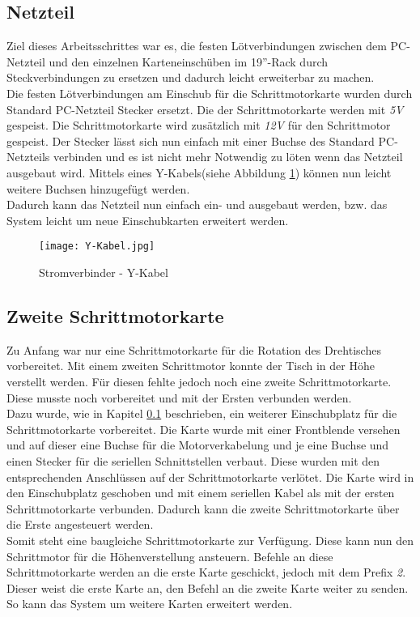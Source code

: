 \subsection{Netzteil}
\label{sec:Netzteil}
Ziel dieses Arbeitsschrittes war es, die festen Lötverbindungen zwischen dem PC-Netzteil und den einzelnen Karteneinschüben im 19''-Rack durch Steckverbindungen zu ersetzen und dadurch leicht erweiterbar zu machen.\\
Die festen Lötverbindungen am Einschub für die Schrittmotorkarte wurden durch Standard PC-Netzteil Stecker ersetzt. %
Die  der Schrittmotorkarte werden mit \emph{5V} gespeist. Die Schrittmotorkarte wird zusätzlich mit \emph{12V} für den Schrittmotor gespeist. Der Stecker lässt sich nun einfach mit einer Buchse des Standard PC-Netzteils verbinden und es ist nicht mehr Notwendig zu löten wenn das Netzteil ausgebaut wird. Mittels eines Y-Kabels(siehe Abbildung \ref{fig:Y-Kabel}) können nun leicht weitere Buchsen hinzugefügt werden.\\
Dadurch kann das Netzteil nun einfach ein- und ausgebaut werden, bzw. das System leicht um neue Einschubkarten erweitert werden.
\begin{figure}[h]
\centering
\texttt{[image: Y-Kabel.jpg]}
\caption{Stromverbinder - Y-Kabel\cite{kosatec}}
\label{fig:Y-Kabel}
\end{figure}

\subsection{Zweite Schrittmotorkarte}
Zu Anfang war nur eine Schrittmotorkarte für die Rotation des Drehtisches vorbereitet. Mit einem zweiten Schrittmotor konnte der Tisch in der Höhe verstellt werden. Für diesen fehlte jedoch noch eine zweite Schrittmotorkarte. Diese musste noch vorbereitet und mit der Ersten verbunden werden.\\
Dazu wurde, wie in Kapitel \ref{sec:Netzteil} beschrieben, ein weiterer Einschubplatz für die Schrittmotorkarte vorbereitet. Die Karte wurde mit einer Frontblende versehen und auf dieser eine Buchse für die Motorverkabelung und je eine Buchse und einen Stecker für die seriellen Schnittstellen verbaut. Diese wurden mit den entsprechenden Anschlüssen auf der Schrittmotorkarte verlötet. Die Karte wird in den Einschubplatz geschoben und mit einem seriellen Kabel als  mit der ersten Schrittmotorkarte verbunden. Dadurch kann die zweite Schrittmotorkarte über die Erste angesteuert werden.\\
Somit steht eine baugleiche Schrittmotorkarte zur Verfügung. Diese kann nun den Schrittmotor für die Höhenverstellung ansteuern. Befehle an diese Schrittmotorkarte werden an die erste Karte geschickt, jedoch mit dem Prefix \emph{2}. Dieser weist die erste Karte an, den Befehl an die zweite Karte weiter zu senden. So kann das System um weitere Karten erweitert werden.

